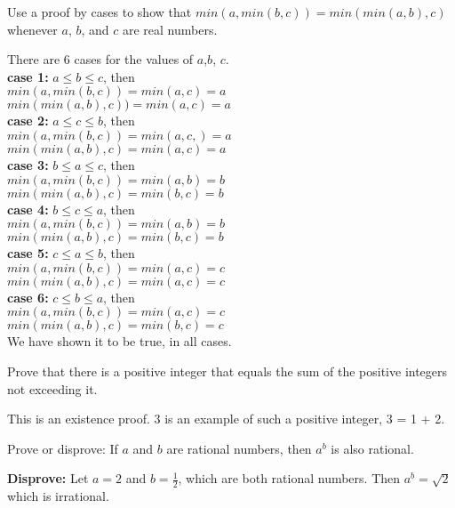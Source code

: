\begin{questions}
 Use a proof by cases to show that $min(a, min(b,c)) =
min(min(a,b),c)$ whenever $a$, $b$, and $c$ are real numbers.
    \ifprintanswers
        \vspace{-10pt}
    \fi
\begin{solution}
    There are 6 cases for the values of $a$,$b$, $c$. \\
    \textbf{case 1:} $a \leq b \leq c$, then \\
        $min(a, min(b,c)) = min(a,c) = a$ \\
        $min(min(a,b),c)) = min(a,c) = a$ \\
    \textbf{case 2:} $a \leq c \leq b$, then \\
        $min(a, min(b,c)) = min(a,c,) = a$ \\
        $min(min(a,b),c) = min(a,c) = a$ \\
    \textbf{case 3:} $b \leq a \leq c$, then \\
        $min(a, min(b,c)) = min(a,b) = b$\\
        $min(min(a,b),c) = min(b,c) = b$ \\
    \textbf{case 4:} $b \leq c \leq a$, then \\
        $min(a, min(b,c)) = min(a,b) = b$ \\
        $min(min(a,b),c) = min(b,c) = b$ \\
    \textbf{case 5:} $c \leq a \leq b$, then \\
        $min(a, min(b,c)) = min(a,c) = c$\\
        $min(min(a,b),c) = min(a,c) = c$ \\
    \textbf{case 6:} $c \leq b \leq a$, then \\
        $min(a, min(b,c)) = min(a,c) = c$ \\
        $min(min(a,b),c) = min(b,c) = c$ \\
    We have shown it to be true, in all cases.
\end{solution}



 Prove that there is a positive integer that equals the
sum of the positive integers not exceeding it.
    \ifprintanswers
        \vspace{-10pt}
    \fi
\begin{solution}
    This is an existence proof.  3 is an example of such a positive
    integer, 3 = 1 + 2.
\end{solution}


 Prove or disprove: If $a$ and $b$ are rational
numbers, then $a^b$ is also rational.
    \ifprintanswers
        \vspace{-10pt}
    \fi
\begin{solution}
    \textbf{Disprove:} Let $a=2$ and $b=\frac{1}{2}$, which are both rational numbers.  Then $a^b =
    \sqrt{2}$ which is irrational.
\end{solution}



\end{questions}
